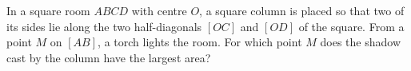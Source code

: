 In a square room $ABCD$ with centre $O$, a square column is placed so that two of its sides lie along the two half-diagonals $[OC]$ and $[OD]$ of the square. From a point $M$ on $[AB]$, a torch lights the room. For which point $M$ does the shadow cast by the column have the largest area?

